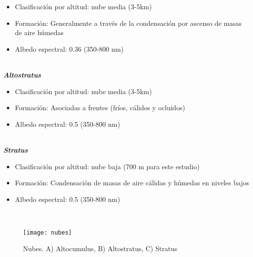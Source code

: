 \begin{itemize}

    \item Clasificación por altitud: nube media (3-5km)
    
    \item Formación: Generalmente a través de la condensación por ascenso de masas de aire húmedas
    
    \item Albedo espectral: 0.36 (350-800 nm)
    
\end{itemize}

\\

\textit{\textbf{Altostratus}}

\begin{itemize}

    \item Clasificación por altitud: nube media (3-5km)
    
    \item Formación: Asociadas a frentes (fríos, cálidos y ocluidos)
    
    \item Albedo espectral: 0.5 (350-800 nm)
    
\end{itemize}

\\

\textit{\textbf{Stratus}}

\begin{itemize}

    \item Clasificación por altitud: nube baja (700 m para este estudio)
    
    \item Formación: Condensación de masas de aire cálidas y húmedas en niveles bajos
    
    \item Albedo espectral: 0.5 (350-800 nm)
    
\end{itemize}

\\

\begin{figure}[htb]
  \centering
    \texttt{[image: nubes]}
  \caption{Nubes. A) Altocumulus, B) Altostratus, C) Stratus \citep{Metoffice2019}}
  \label{nubes}
\end{figure}

